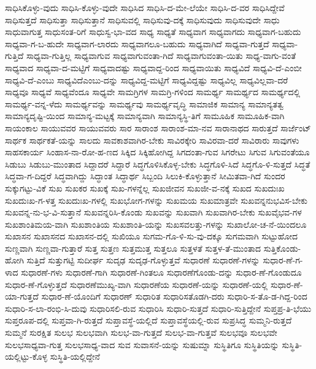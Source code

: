 {ಸಾಧಿಸಿಕೊಳ್ಳು-ವುದು
ಸಾಧಿಸಿ-ಕೊಳ್ಳು-ವುದೇ
ಸಾಧಿಸಿದ
ಸಾಧಿಸಿ-ದ-ಮೇ-ಲೆಯೇ
ಸಾಧಿಸಿ-ದ-ವರ
ಸಾಧಿಸಿದ್ದೇವೆ
ಸಾಧಿಸುತ್ತದೆ
ಸಾಧಿಸುತ್ತಾ
ಸಾಧಿಸುತ್ತಾನೆ
ಸಾಧಿಸುವಲ್ಲಿ
ಸಾಧಿಸುವು-ದಕ್ಕೆ
ಸಾಧಿಸುವುದು
ಸಾಧಿಸುವುದೇ
ಸಾಧು
ಸಾಧುವಾಗುತ್ತ
ಸಾಧುಸಂತ-ರಿಗೆ
ಸಾಧುಸ್ವ-ಭಾ-ವದ
ಸಾಧ್ಯ
ಸಾಧ್ಯತೆ
ಸಾಧ್ಯವಾಗ
ಸಾಧ್ಯವಾಗದು
ಸಾಧ್ಯವಾಗ-ಬಹುದು
ಸಾಧ್ಯವಾ-ಗ-ಬ-ಹುದೇ
ಸಾಧ್ಯವಾಗ-ಲಾರದು
ಸಾಧ್ಯವಾಗಲೂ-ಬಹುದು
ಸಾಧ್ಯವಾಗಿದೆ
ಸಾಧ್ಯವಾ-ಗುತ್ತದೆ
ಸಾಧ್ಯವಾ-ಗುತ್ತಿದೆ
ಸಾಧ್ಯವಾ-ಗುತ್ತಿಲ್ಲ
ಸಾಧ್ಯವಾಗುವ
ಸಾಧ್ಯವಾಗುವಂತಾ-ಗಿದೆ
ಸಾಧ್ಯವಾಗುವಂತಾ-ಯಿತು
ಸಾಧ್ಯ-ವಾಗು-ವಂತೆ
ಸಾಧ್ಯವಾದ
ಸಾಧ್ಯವಾ-ದ-ಮಟ್ಟಿಗೆ
ಸಾಧ್ಯವಾದಷ್ಟು
ಸಾಧ್ಯವಾದ್ದ-ರಿಂದ
ಸಾಧ್ಯವಾಯಿತು
ಸಾಧ್ಯವಿದೆ
ಸಾಧ್ಯವಿ-ದೆ-ಎಂಬೀ
ಸಾಧ್ಯವಿ-ದೆ-ಎಂಬು
ಸಾಧ್ಯವಿದೆಎಂಬು-ದನ್ನು
ಸಾಧ್ಯವಿದ್ದ-ಮಟ್ಟಿಗೆ
ಸಾಧ್ಯವಿದ್ದಷ್ಟು
ಸಾಧ್ಯವಿಲ್ಲ
ಸಾಧ್ಯವಿಲ್ಲವಾ-ದರೆ
ಸಾಧ್ಯವೂ
ಸಾಧ್ಯವೆ
ಸಾಧ್ಯವೆಂದೂ
ಸಾಧ್ಯವೇ
ಸಾಮಗ್ರಿಗಳ
ಸಾಮಗ್ರಿ-ಗಳಿಂದ
ಸಾಮರ್ಥ್ಯ
ಸಾಮರ್ಥ್ಯದ
ಸಾಮರ್ಥ್ಯದಲ್ಲಿ
ಸಾಮರ್ಥ್ಯ-ವನ್ನ-ಳೆದು
ಸಾಮರ್ಥ್ಯವನ್ನು
ಸಾಮರ್ಥ್ಯವು
ಸಾಮರ್ಥ್ಯವೃದ್ಧಿ
ಸಾಮಾಜಿಕ
ಸಾಮಾನ್ಯ
ಸಾಮಾನ್ಯತತ್ವ
ಸಾಮಾನ್ಯದೃಷ್ಟಿ-ಯಿಂದ
ಸಾಮಾನ್ಯ-ಮಟ್ಟಕ್ಕೆ
ಸಾಮಾನ್ಯವಾಗಿ
ಸಾಮಾನ್ಯಸ್ಥಿ-ತಿಗೆ
ಸಾಮೂಹಿಕ
ಸಾಮೂಹಿಕ-ವಾಗಿ
ಸಾಯಂಕಾಲ
ಸಾಯುವವರ
ಸಾಯುವವರು
ಸಾರ
ಸಾರಾಂಶ
ಸಾರಾಂಶ-ಮಾ-ನವ
ಸಾರಾನಾಥದ
ಸಾರುತ್ತದೆ
ಸಾರ್ಜೆಂಟ್
ಸಾರ್ಥಕ
ಸಾರ್ಥಕತೆ-ಯನ್ನು
ಸಾಲದು
ಸಾವಕಾಶವಾಗಿರ-ಬೇಕು
ಸಾವಿರಕ್ಕೇರಿ
ಸಾವಿರವಾ-ದರೆ
ಸಾವಿರಾರು
ಸಾವುಗಳು
ಸಾಹಸಕಾರ್ಯ
ಸಿಂಹಾಸ-ನಾ-ರೋ-ಹ-ಣದ
ಸಿಕ್ಕಿದ
ಸಿಕ್ಕಿಹೋಗಿದ್ದ
ಸಿಗದಂತಾ-ಗುವ
ಸಿಗರೇಟು
ಸಿಗುವ
ಸಿಗುವಂತೆಯೂ
ಸಿಡುಬು
ಸಿಡುಬು-ಮುಂತಾದ
ಸಿದ್ದಾದರೆ
ಸಿದ್ದಾರೆ
ಸಿದ್ಧಗೊಳಿಸಿಕೊಳ್ಳ-ಬೇಕು
ಸಿದ್ಧಗೊಳಿ-ಸಿದೆ
ಸಿದ್ಧಗೊ-ಳಿ-ಸುತ್ತದೆ
ಸಿದ್ಧತೆ
ಸಿದ್ಧವಾ-ಗ-ದಿದ್ದರೆ
ಸಿದ್ಧವಾಗಿದ್ದು
ಸಿದ್ಧಾಂತ
ಸಿದ್ಧಾರ್ಥ
ಸಿಬ್ಬಂದಿ
ಸಿಲುಕಿ-ಕೊಳ್ಳುತ್ತಾನೆ
ಸೀಮಿತವಾ-ಗಿದೆ
ಸುಂದರ
ಸುಕ್ಕುಗಟ್ಟು-ವಿಕೆ
ಸುಖ
ಸುಖಕರ
ಸುಖಕ್ಕೆ
ಸುಖ-ಗಳನ್ನೆಲ್ಲ
ಸುಖಜೀವನ
ಸುಖಜೀ-ವ-ನಕ್ಕೆ
ಸುಖದ
ಸುಖದುಃಖ
ಸುಖದುಃಖ-ಗ-ಳತ್ತ
ಸುಖದುಃಖ-ಗಳಲ್ಲಿ
ಸುಖಭೋಗ-ಗಳನ್ನು
ಸುಖಮಯ
ಸುಖಮಾತ್ರವೇ
ಸುಖವನ್ನನುಭವಿಸ-ಬೇಕು
ಸುಖವನ್ನ-ನು-ಭ-ವಿ-ಸುತ್ತಾನೆ
ಸುಖವನ್ನರಿಸಿ-ಕೊಂಡು
ಸುಖವನ್ನು
ಸುಖವಾಗಿ
ಸುಖವಾಗಿರ-ಬೇಕು
ಸುಖವೈಭವ-ಗಳ
ಸುಖಶಾಂತಿಮಯ-ವಾಗಿ
ಸುಖಶಾಂತಿಯ
ಸುಖಶಾಂತಿ-ಯನ್ನು
ಸುಖಸವಲತ್ತು-ಗಳನ್ನು
ಸುಖಾಲೋ-ಚ-ನೆ-ಯಿಂದಲೂ
ಸುಖಾಸನ
ಸುಖಾಸನದ
ಸುಖಾಸನ-ದಲ್ಲಿ
ಸುಖಿಯೂ
ಸುಗಮ-ಗೊ-ಳಿ-ಸು-ವು-ದಕ್ಕೂ
ಸುಗಮವಾಗಿ
ಸುಟ್ಟುಹೋದ
ಸುಣ್ಣವಾಗಿ
ಸುಣ್ಣವಾ-ಗುತ್ತಾರೆ
ಸುತ್ತ
ಸುತ್ತಣ
ಸುತ್ತಮುತ್ತ
ಸುತ್ತಲೂ
ಸುತ್ತಳತೆ
ಸುತ್ತಳ-ತೆ-ಮುಂತಾದ
ಸುತ್ತಿಕೊಂಡು-ಹೋಗಿ
ಸುತ್ತಿದೆ
ಸುತ್ತುಗಟ್ಟಿ
ಸುದೀರ್ಘ
ಸುದೃಢ
ಸುದೃಢ-ಗೊಳ್ಳುತ್ತವೆ
ಸುಧಾರಣೆ
ಸುಧಾರಣೆ-ಗಳನ್ನು
ಸುಧಾರ-ಣೆ-ಗ-ಳಾದ
ಸುಧಾರಣೆ-ಗಳು
ಸುಧಾರಣೆ-ಗಾಗಿ
ಸುಧಾರಣೆ-ಗಿಂತಲೂ
ಸುಧಾರಣೆಗೊಂಡು-ದನ್ನು
ಸುಧಾರ-ಣೆ-ಗೊಂಡುದೂ
ಸುಧಾರ-ಣೆ-ಗೊಳ್ಳುತ್ತದೆ
ಸುಧಾರಣೆಮುಖ್ಯ-ವಾಗಿ
ಸುಧಾರಣೆಯ
ಸುಧಾರಣೆ-ಯನ್ನು
ಸುಧಾರಣೆ-ಯಲ್ಲಿ
ಸುಧಾರ-ಣೆ-ಯಾ-ಗುತ್ತದೆ
ಸುಧಾರ-ಣೆ-ಯೊಂದಿಗೆ
ಸುಧಾರಣ್
ಸುಧಾರಿತ
ಸುಧಾರಿಸತೊಡಗಿ-ದರು
ಸುಧಾರಿ-ಸ-ತೊ-ಡ-ಗಿದ್ದ-ರಿಂದ
ಸುಧಾರಿ-ಸ-ಲಾ-ರಂಭಿ-ಸಿ-ದುವು
ಸುಧಾರಿಸಲಿ-ರುವ
ಸುಧಾರಿಸಿ
ಸುಧಾರಿ-ಸುತ್ತದೆ
ಸುಧಾರಿ-ಸುತ್ತಿದ್ದೇನೆ
ಸುಪ್ತಪ್ರ-ತಿ-ಭೆಯು
ಸುಪ್ತರೂಪ-ದಲ್ಲಿ
ಸುಪ್ತವಾ-ಗಿ-ರುತ್ತದೆ
ಸುಪ್ತಾವಸ್ಥೆ-ಯಲ್ಲಿದೆ
ಸುಪ್ತಾವಸ್ಥೆಯಲ್ಲಿ-ರುವ
ಸುಪ್ರಸಿದ್ಧ
ಸುಮ್ಮನಿ-ರುತ್ತದೆ
ಸುಮ್ಮನೆ
ಸುರಕ್ಷಿತ
ಸುಲಭ
ಸುಲಭವಾಗಿ
ಸುಲಭ-ವಾ-ಗುತ್ತದೆ
ಸುಲಭ-ವಾ-ಗುತ್ತವೆ
ಸುಲಭವೂ
ಸುಲಭವೇ
ಸುಲಭಸಾಧ್ಯವಾ-ಗುತ್ತ
ಸುಲಭಸಾಧ್ಯ-ವಾದ
ಸುವ
ಸುವಾಸನೆ-ಯನ್ನು
ಸುಷುಮ್ನಾ
ಸುಸ್ಥಿತಿಗೂ
ಸುಸ್ಥಿತಿಯನ್ನು
ಸುಸ್ಥಿತಿ-ಯಲ್ಲಿಟ್ಟು-ಕೊಳ್ಳ
ಸುಸ್ಥಿತಿ-ಯಲ್ಲಿದ್ದೇನೆ
}
